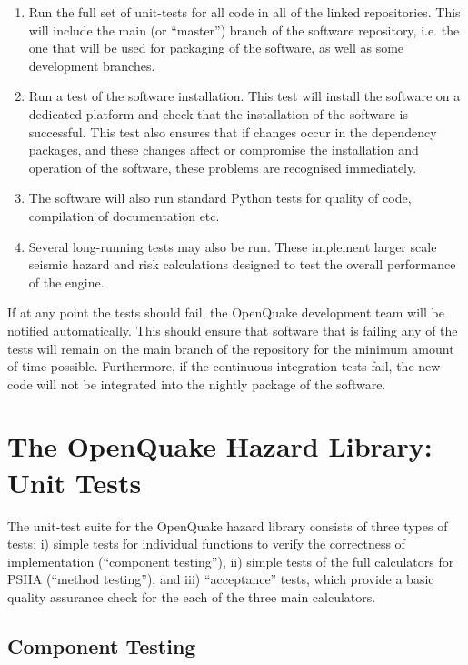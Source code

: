 \begin{enumerate}
\item Run the full set of unit-tests for all code in all of the linked 
    repositories. This will include the main (or ``master'') branch of 
    the software repository, i.e. the one that will be used for 
    packaging of the software, as well as some development branches.

\item Run a test of the software installation. This test will install 
    the software on a dedicated platform and check that the installation 
    of the software is successful. This test also ensures that if changes
    occur in the dependency packages, and these changes affect or 
    compromise the installation and operation of the software, these
    problems are recognised immediately.

\item The software will also run standard Python tests for quality of 
    code, compilation of documentation etc.

\item Several long-running tests may also be run. These implement larger 
    scale seismic hazard and risk calculations designed to test the 
    overall performance of the engine. 
\end{enumerate}

If at any point the tests should fail, the OpenQuake development team 
will be notified automatically. 
This should ensure that software that is failing any of the tests will 
remain on the main branch of the repository for the minimum amount of 
time possible. 
Furthermore, if the continuous integration tests fail, the new code 
will not be integrated into the nightly package of the software. 

\section{The OpenQuake Hazard Library: Unit Tests}

The unit-test suite for the OpenQuake hazard library consists of three 
types of tests: i) simple tests for individual functions to verify the
correctness of implementation (``component testing''), ii) simple tests
of the full calculators for PSHA (``method testing''), and iii) 
``acceptance'' tests, which provide a basic quality assurance check 
for the each of the three main calculators. 

\subsection{Component Testing}

